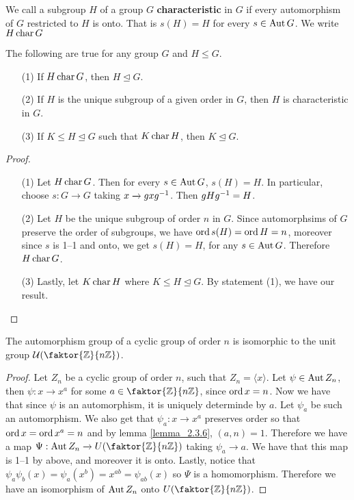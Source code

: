 \begin{definition}
  We call a subgroup $H$ of a group  $G$  \textbf{characteristic} in $G$ if
  every automorphism of $G$ restricted to  $H$ is onto. That is $s(H)=H$ for
  every $s \in \operatorname{Aut}{G}$. We write $H \operatorname{char}{G}$
\end{definition}

\begin{lemma}\label{lemma_4.4.4}
  The following are true for any group $G$ and  $H \leq G$.
  \begin{enumerate}
    \item[(1)] If $H \operatorname{char}{G}$, then $H \unlhd{G}$.

    \item[(2)] If $H$ is the unique subgroup of a given order in  $G$, then
      $H$ is characteristic in  $G$.

    \item[(3)] If $K \leq H \unlhd G$ such that  $K \operatorname{char}{H}$, then $K
      \unlhd G$.
  \end{enumerate}
\end{lemma}
\begin{proof}
  \begin{enumerate}
    \item[(1)] Let $H \operatorname{char}{G}$. Then for every $s \in \operatorname{Aut}{G}$, $s(H)=H$.
      In particular, choose $s:G \xrightarrow{} G$ taking $x
      \xrightarrow{} gxg^{-1}$. Then $gHg^{-1}=H$.

    \item[(2)] Let $H$ be the unique subgroup of order $n$ in $G$. Since
      automorphsims of $G$ preserve the order of subgroups, we have
      $\operatorname{ord}{s(H)}=\operatorname{ord}{H}=n$, moreover since $s$ is 1--1 and onto, we get
      $s(H)=H$, for any $s \in \operatorname{Aut}{G}$. Therefore $H \operatorname{char}{G}$.

    \item[(3)] Lastly, let $K \operatorname{char}{H}$ where $K \leq H \unlhd G$. By
      statement (1), we have our result.
  \end{enumerate}
\end{proof}

\begin{theorem}\label{lemma_4.4.5}
  The automorphism group of a cyclic group of order $n$ is isomorphic to the
  unit group $\Uc{(\faktor{\Z}{n\Z})}$.
\end{theorem}
\begin{proof}
  Let $Z_n$ be a cyclic group of order $n$, such that $Z_n=\langle x \rangle$.
  Let $\psi \in \operatorname{Aut}{Z_n}$, then $\psi:x \xrightarrow{} x^a$ for some $a \in
  \faktor{\Z}{n\Z}$, since $\operatorname{ord}{x}=n$. Now we have that since $\psi$ is an
  automorphism, it is uniquely determinde by $a$. Let $\psi_a$ be such an
  automorphism. We also get that  $\psi_a:x \xrightarrow{} x^a$ preserves
  order so that $\operatorname{ord}{x}=\operatorname{ord}{x^a}=n$ and by lemma \ref{lemma_2.3.6}, $(a,n)=1$.
  Therefore we have a map $\Psi:\Aut{Z_n} \xrightarrow{} U(\faktor{\Z}{n\Z})$
  taking $\psi_a \xrightarrow{} a$. We have that this map is 1--1 by above,
  and moreover it is onto. Lastly, notice that
  $\psi_a\psi_b(x)=\psi_a(x^b)=x^{ab}=\psi_{ab}(x)$ so $\Psi$ is a
  homomorphism. Therefore we have an isomorphism of $\operatorname{Aut}{Z_n}$ onto
  $U(\faktor{\Z}{n\Z})$.
\end{proof}

